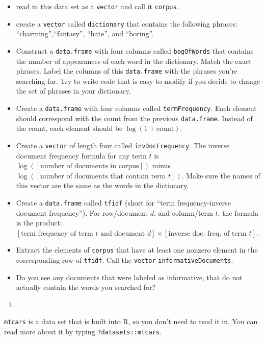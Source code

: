 \documentclass[
  12pt,
  krantz2]{krantz}
\providecommand{\tightlist}{%
  \setlength{\itemsep}{0pt}\setlength{\parskip}{0pt}}
\begin{document}
\begin{itemize}
\tightlist
\item
  read in this data set as a \texttt{vector} and call it \texttt{corpus}.
\item
  create a \texttt{vector} called \texttt{dictionary} that contains the following phrases: ``charming'',``fantasy'', ``hate'', and ``boring''.
\item
  Construct a \texttt{data.frame} with four columns called \texttt{bagOfWords} that contains the number of appearances of each word in the dictionary. Match the exact phrases. Label the columns of this \texttt{data.frame} with the phrases you're searching for. Try to write code that is easy to modify if you decide to change the set of phrases in your dictionary.
\item
  Create a \texttt{data.frame} with four columns called \texttt{termFrequency}. Each element should correspond with the count from the previous \texttt{data.frame}. Instead of the count, each element should be \(\log(1 + \text{count})\).
\item
  Create a \texttt{vector} of length four called \texttt{invDocFrequency}. The inverse document frequency formula for any term \(t\) is \(\log([\text{number of documents in corpus}])\) minus \(\log([\text{number of documents that contain term } t])\). Make sure the names of this vector are the same as the words in the dictionary.
\item
  Create a \texttt{data.frame} called \texttt{tfidf} (short for ``term frequency-inverse document frequency''). For row/document \(d\), and column/term \(t\), the formula is the product: \([\text{term frequency of term } t \text{ and document } d ] \times [\text{inverse doc. freq. of term } t]\).
\item
  Extract the elements of \texttt{corpus} that have at least one nonzero element in the corresponding row of \texttt{tfidf}. Call the \texttt{vector} \texttt{informativeDocuments}.
\item
  Do you see any documents that were labeled as informative, that do not actually contain the words you searched for?
\end{itemize}

\begin{enumerate}
\def\labelenumi{\arabic{enumi}.}
\setcounter{enumi}{1}
\tightlist
\item
\end{enumerate}

\texttt{mtcars} is a data set that is built into R, so you don't need to read it in. You can read more about it by typing \texttt{?datasets::mtcars}.
\end{document}
